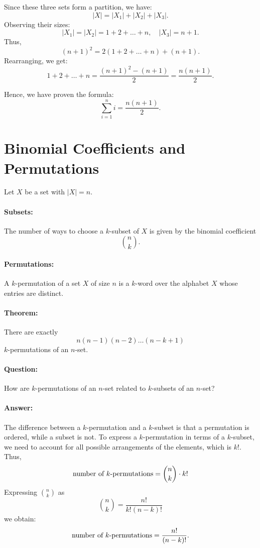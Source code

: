 \documentclass[docmute]{article}
\begin{document}
Since these three sets form a partition, we have:  
\[
|X| = |X_1| + |X_2| + |X_3|.
\]  
Observing their sizes:  
\[
|X_1| = |X_2| = 1 + 2 + \dots + n, \quad |X_3| = n+1.
\]  
Thus,  
\[
(n+1)^2 = 2(1 + 2 + \dots + n) + (n+1).
\]  
Rearranging, we get:  
\[
1 + 2 + \dots + n = \frac{(n+1)^2 - (n+1)}{2} = \frac{n(n+1)}{2}.
\]

Hence, we have proven the formula:  
\[
\sum_{i=1}^{n} i = \frac{n(n+1)}{2}.
\]


\section{Binomial Coefficients and Permutations}
Let $X$ be a set with $|X| = n$.

\paragraph{Subsets:}  
The number of ways to choose a $k$-subset of $X$ is given by the binomial coefficient
\[
\binom{n}{k}.
\]

\paragraph{Permutations:}  
A \( k \)-permutation of a set \( X \) of size \( n \) is a \( k \)-word over the alphabet \( X \) whose entries are distinct.  

\paragraph{Theorem:}  
There are exactly  
\[
n (n-1) (n-2) \dots (n-k+1)
\]  
\( k \)-permutations of an \( n \)-set.  

\paragraph{Question:}  
How are \( k \)-permutations of an \( n \)-set related to \( k \)-subsets of an \( n \)-set?  

\paragraph{Answer:}  
The difference between a \( k \)-permutation and a \( k \)-subset is that a permutation is ordered, while a subset is not.  
To express a \( k \)-permutation in terms of a \( k \)-subset, we need to account for all possible arrangements of the elements, which is \( k! \).
Thus,
\[
\text{number of \( k \)-permutations} = \binom{n}{k} \cdot k!
\]
Expressing \( \binom{n}{k} \) as
\[
\binom{n}{k} = \frac{n!}{k!(n-k)!}
\]
we obtain:
\[
\text{number of \( k \)-permutations} = \frac{n!}{(n-k)!}.
\]
\end{document}
